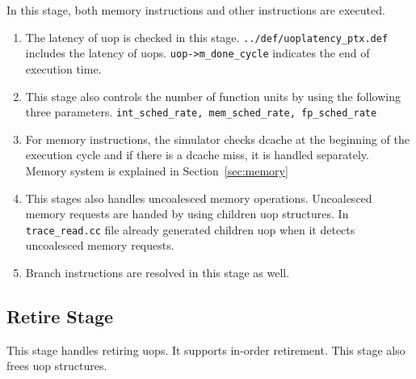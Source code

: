 In this stage, both memory instructions and other instructions are executed. 
\begin{enumerate} 

\item The latency of uop is checked in this stage. 
{\tt ../def/uoplatency\_ptx.def} includes the latency of uops. 
{\tt uop->m\_done\_cycle} indicates the end of execution time. 

\item This stage also controls the number of function units by using the following three parameters. 
{\tt int\_sched\_rate, mem\_sched\_rate, fp\_sched\_rate}

\item For memory instructions, the simulator checks dcache at the beginning of the execution cycle 
and if there is a dcache miss, it is handled separately. Memory system is explained in Section~\ref{sec:memory}

\item This stages also handles uncoalesced memory operations. Uncoalesced memory requests are handed 
by using children uop structures. In {\tt trace\_read.cc} file already generated children uop when it detects uncoalesced memory requests. 

\item Branch instructions are resolved in this stage as well. 
\end{enumerate} 

\subsection{Retire Stage}
This stage handles retiring uops. It supports in-order retirement. 
This stage also frees uop structures. 


